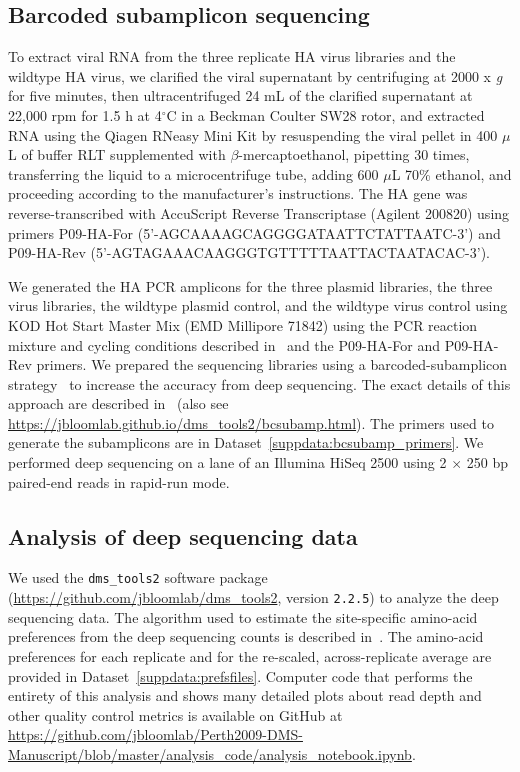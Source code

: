 \documentclass[9pt,twocolumn,twoside]{pnas-new}
\begin{document}
{\subsection*{Barcoded subamplicon sequencing}
To extract viral RNA from the three replicate HA virus libraries and the wildtype HA virus, we clarified the viral supernatant by centrifuging at 2000 x \textit{g} for five minutes, then ultracentrifuged 24 mL of the clarified supernatant at 22,000 rpm for 1.5 h at 4$^{\circ}$C in a Beckman Coulter SW28 rotor, and extracted RNA using the Qiagen RNeasy Mini Kit by resuspending the viral pellet in 400 $\mu$L of buffer RLT supplemented with $\beta$-mercaptoethanol, pipetting 30 times, transferring the liquid to a microcentrifuge tube, adding 600 $\mu$L 70\% ethanol, and proceeding according to the manufacturer's instructions.
The HA gene was reverse-transcribed with AccuScript Reverse Transcriptase (Agilent 200820) using primers P09-HA-For (5'-AGCAAAAGCAGGGGATAATTCTATTAATC-3') and P09-HA-Rev (5'-AGTAGAAACAAGGGTGTTTTTAATTACTAATACAC-3').

We generated the HA PCR amplicons for the three plasmid libraries, the three virus libraries, the wildtype plasmid control, and the wildtype virus control using KOD Hot Start Master Mix (EMD Millipore 71842) using the PCR reaction mixture and cycling conditions described in~\cite{bloom2014experimentally} and the P09-HA-For and P09-HA-Rev primers.
We prepared the sequencing libraries using a barcoded-subamplicon strategy~\cite{wu2014high} to increase the accuracy from deep sequencing.
The exact details of this approach are described in~\cite{doud2016accurate} (also see \url{https://jbloomlab.github.io/dms_tools2/bcsubamp.html}).
The primers used to generate the subamplicons are in Dataset~\ref{suppdata:bcsubamp_primers}.
We performed deep sequencing on a lane of an Illumina HiSeq 2500 using 2 $\times$ 250 bp paired-end reads in rapid-run mode.

\subsection*{Analysis of deep sequencing data}
We used the \texttt{dms\_tools2} software package~\cite{bloom2015software} (\url{https://github.com/jbloomlab/dms_tools2}, version \texttt{2.2.5}) to analyze the deep sequencing data.
The algorithm used to estimate the site-specific amino-acid preferences from the deep sequencing counts is described in~\cite{bloom2015software}.
The amino-acid preferences for each replicate and for the re-scaled, across-replicate average are provided in Dataset~\ref{suppdata:prefsfiles}.
Computer code that performs the entirety of this analysis and shows many detailed plots about read depth and other quality control metrics is available on GitHub at \url{https://github.com/jbloomlab/Perth2009-DMS-Manuscript/blob/master/analysis_code/analysis_notebook.ipynb}.

}
\end{document}
